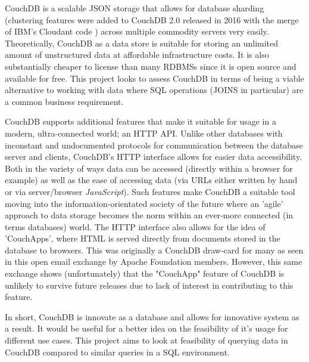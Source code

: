 CouchDB is a scalable JSON storage that allows for database sharding (clustering features were added to CouchDB 2.0 released in 2016 with the merge of IBM's Cloudant code \cite{couchdb2.0}) across multiple commodity servers very easily. Theoretically, CouchDB as a data store is suitable for storing an unlimited amount of unstructured data at affordable infrastructure costs. It is also substantially cheaper to license than many RDBMSs since it is open source and available for free. This project looks to assess CouchDB in terms of being a viable alternative to working with data where SQL operations (JOINS in particular) are a common business requirement.

CouchDB supports additional features that make it suitable for usage in a modern, ultra-connected world; an HTTP API. Unlike other databases with inconstant and undocumented protocols for communication between the database server and clients, CouchDB's HTTP interface allows for easier data accessibility. Both in the variety of ways data can be accessed (directly within a browser for example) as well as the ease of accessing data (via URLs either written by hand or via server/browser \textit{JavaScript}). Such features make CouchDB a suitable tool moving into the information-orientated society of the future where an 'agile' approach to data storage becomes the norm within an ever-more connected (in terms databases) world. The HTTP interface also allows for the idea of 'CouchApps', where HTML is served directly from documents stored in the database to browsers. This was originally a CouchDB draw-card for many as seen in this open email exchange \cite{googleCon2017} by Apache Foundation members. However, this same exchange shows (unfortunately) that the "CouchApp" feature of CouchDB is unlikely to survive future releases due to lack of interest in contributing to this feature.

In short, CouchDB is innovate as a database and allows for innovative system as a result. It would be useful for a better idea on the feasibility of it's usage for different use cases. This project aims to look at feasibility of querying data in CouchDB compared to similar queries in a SQL environment.
